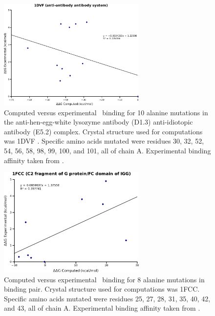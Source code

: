 \begin{figure}[h]
    \centering
  \includegraphics[width=0.65\textwidth]{figures/1dvf.png}
  \caption{
Computed versus experimental \ddg\ binding for 10 alanine mutations in the anti-hen-egg-white lysozyme antibody (D1.3) anti-idiotopic antibody (E5.2) complex.
Crystal structure used for computations was 1DVF \protect\cite{braden1996crystal}.
Specific amino acids mutated were residues 30, 32, 52, 54, 56, 58, 98, 99, 100, and 101, all of chain A.
Experimental binding affinity taken from \protect\cite{thorn2001asedb}.
            }
\end{figure}

\begin{figure}[h]
    \centering
  \includegraphics[width=0.65\textwidth]{figures/1fcc.png}
  \caption{
Computed versus experimental \ddg\ binding for 8 alanine mutations in  binding pair.
Crystal structure used for computations was 1FCC.
Specific amino acids mutated were residues 25, 27, 28, 31, 35, 40, 42, and 43, all of chain A.
Experimental binding affinity taken from \protect\cite{thorn2001asedb}.
          }
\end{figure}

